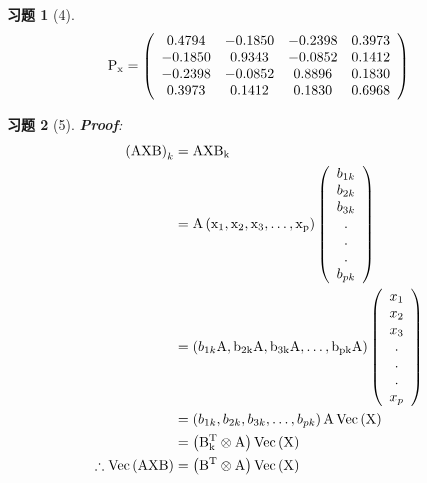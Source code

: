 \documentclass[12pt, oneside]{article}
\newtheorem*{exercise}{\textbf{习题}}
\begin{document}
  \begin{exercise}[4]
	\scriptsize
	\begin{equation*}
	  \rm{
		P_x = \left(
		\begin{array}{cccc}
		  0.4794 & -0.1850 & -0.2398 & 0.3973 \\
		  -0.1850 & 0.9343 & -0.0852 & 0.1412 \\
		  -0.2398 & -0.0852 & 0.8896 & 0.1830 \\
		  0.3973 & 0.1412 & 0.1830 & 0.6968 \\
		\end{array}
		\right)
	  }
	\end{equation*}
  \end{exercise}

  \begin{exercise}[5]
	\rm{
	  \textbf{Proof}:\\
	  \begin{equation*}
		\begin{aligned}
		  \left( \rm{AXB} \right)_k &= \rm{AXB}_k \\
		  &= \rm{A} \left( x_1, x_2, x_3, \dots , x_p \right)
		  \left(
		  \begin{array}{c}
			b_{1k} \\
			b_{2k} \\
			b_{3k} \\
			. \\
			. \\
			. \\
			b_{pk} \\
		  \end{array}
		  \right) \\
		  &= \left( b_{1k}\rm{A}, b_{2k}\rm{A}, b_{3k}\rm{A}, \dots , b_{pk}\rm{A}\right) \left( 
		  \begin{array}{c}
			x_1 \\
			x_2 \\
			x_3 \\
			. \\
			. \\
			. \\
			x_p \\
		  \end{array}
		  \right) \\
		  &= \left( b_{1k}, b_{2k}, b_{3k}, \dots , b_{pk}\right)\rm{A}\operatorname{Vec}\left( \rm{X} \right) \\
		  &= \left( \rm{B}_k^T \otimes \rm{A} \right) \operatorname{Vec} \left( \rm{X} \right) \\ 
	  \therefore \operatorname{Vec}\left( \rm{AXB} \right)	&= \left( \rm{B}^T \otimes \rm{A} \right) \operatorname{Vec} \left( \rm{X} \right)
		\end{aligned} 
	  \end{equation*}
	}
  \end{exercise}
\end{document}
